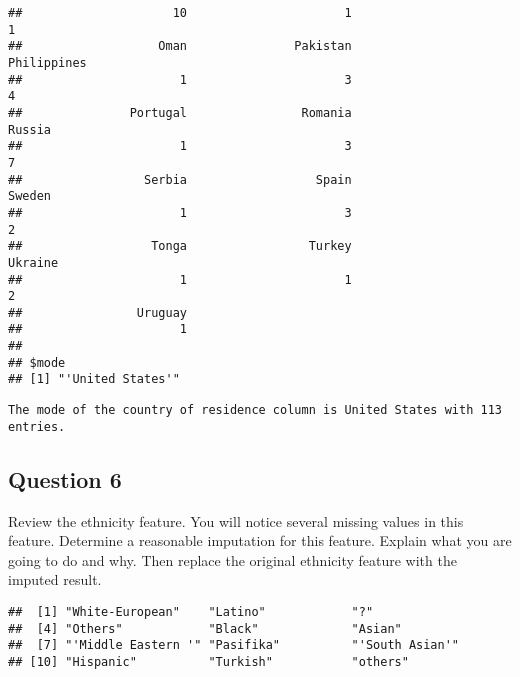 \documentclass[
]{article}
\newenvironment{Shaded}{\begin{snugshade}}{\end{snugshade}}
\newcommand{\CommentTok}[1]{\textcolor[rgb]{0.56,0.35,0.01}{\textit{#1}}}
\newcommand{\FunctionTok}[1]{\textcolor[rgb]{0.13,0.29,0.53}{\textbf{#1}}}
\newcommand{\NormalTok}[1]{#1}
\newcommand{\SpecialCharTok}[1]{\textcolor[rgb]{0.81,0.36,0.00}{\textbf{#1}}}
\begin{document}
\begin{verbatim}
##                     10                      1                      1 
##                   Oman               Pakistan            Philippines 
##                      1                      3                      4 
##               Portugal                Romania                 Russia 
##                      1                      3                      7 
##                 Serbia                  Spain                 Sweden 
##                      1                      3                      2 
##                  Tonga                 Turkey                Ukraine 
##                      1                      1                      2 
##                Uruguay 
##                      1 
## 
## $mode
## [1] "'United States'"
\end{verbatim}

\begin{verbatim}
The mode of the country of residence column is United States with 113 entries.
\end{verbatim}

\subsection{Question 6}\label{question-6}

Review the ethnicity feature. You will notice several missing values in
this feature. Determine a reasonable imputation for this feature.
Explain what you are going to do and why. Then replace the original
ethnicity feature with the imputed result.

\begin{Shaded}
\end{Shaded}

\begin{verbatim}
##  [1] "White-European"    "Latino"            "?"                
##  [4] "Others"            "Black"             "Asian"            
##  [7] "'Middle Eastern '" "Pasifika"          "'South Asian'"    
## [10] "Hispanic"          "Turkish"           "others"
\end{verbatim}
\end{document}
